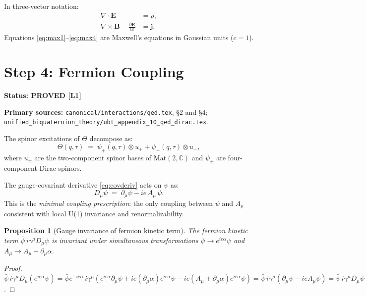 \documentclass[11pt,a4paper]{article}
\newtheorem{proposition}{Proposition}
\newcommand{\Lone}{\textbf{[L1]}}
\newcommand{\PROVED}{\textbf{PROVED}}
\begin{document}
\noindent In three-vector notation:
\begin{align}
  \nabla\cdot\mathbf{E} &= \rho, \label{eq:max3} \\
  \nabla\times\mathbf{B} - \frac{\partial\mathbf{E}}{\partial t} &= \mathbf{j}. \label{eq:max4}
\end{align}
Equations \eqref{eq:max1}--\eqref{eq:max4} are Maxwell's equations in
Gaussian units ($c=1$).

\section{Step 4: Fermion Coupling}

\noindent\textbf{Status: \PROVED{} \Lone}

\noindent\textbf{Primary sources:}
\texttt{canonical/interactions/qed.tex}, \S2 and \S4;
\texttt{unified\_biquaternion\_theory/ubt\_appendix\_10\_qed\_dirac.tex}.

\medskip

The spinor excitations of $\Theta$ decompose as:
\begin{equation}\label{eq:decomp}
  \Theta(q,\tau) \;=\; \psi_+(q,\tau) \otimes u_+ + \psi_-(q,\tau) \otimes u_-,
\end{equation}
where $u_\pm$ are the two-component spinor bases of $\mathrm{Mat}(2,\mathbb{C})$
and $\psi_\pm$ are four-component Dirac spinors.

The gauge-covariant derivative \eqref{eq:covderiv} acts on $\psi$ as:
\begin{equation}\label{eq:Dmu_psi}
  D_\mu\psi \;=\; \partial_\mu\psi - ie\,A_\mu\,\psi.
\end{equation}
This is the \emph{minimal coupling prescription}: the only coupling between
$\psi$ and $A_\mu$ consistent with local U(1) invariance and renormalizability.

\begin{proposition}[Gauge invariance of fermion kinetic term]
The fermion kinetic term $\bar\psi\,i\gamma^\mu D_\mu\psi$ is invariant under
simultaneous transformations $\psi\to e^{ie\alpha}\psi$ and
$A_\mu \to A_\mu + \partial_\mu\alpha$.
\end{proposition}
\begin{proof}
$\bar\psi\,i\gamma^\mu D_\mu(e^{ie\alpha}\psi)
= \bar\psi e^{-ie\alpha}\,i\gamma^\mu(e^{ie\alpha}\partial_\mu\psi
  + ie(\partial_\mu\alpha)e^{ie\alpha}\psi
  - ie(A_\mu+\partial_\mu\alpha)e^{ie\alpha}\psi)
= \bar\psi\,i\gamma^\mu(\partial_\mu\psi - ieA_\mu\psi)
= \bar\psi\,i\gamma^\mu D_\mu\psi$.
\end{proof}
\end{document}
